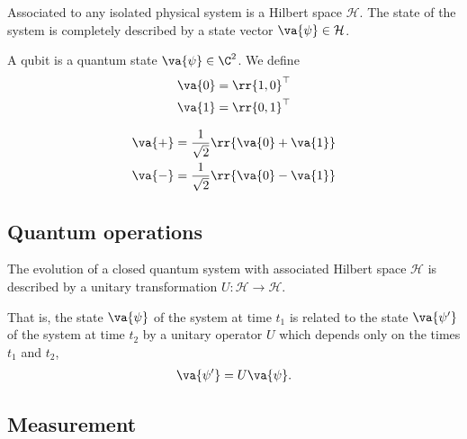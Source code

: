 \documentclass{article}
\begin{document}
\begin{axiom}
  Associated to any isolated physical system is a Hilbert space $\mathcal H$. The state of the system
  is completely described by a state vector $\va{\psi}\in\mathcal H$.
\end{axiom}

\begin{definition}
  \label{def:qubit}
  A qubit is a quantum state $ \va{\psi}\in\C^2$. We define
  \begin{align*}
    \va{ 0 } = \rr{ 1, 0 }^\top \\
    \va{ 1 } = \rr{ 0, 1 }^\top
  \end{align*}
\end{definition}

\begin{definition}
  \label{def:superposition}
  \begin{align*}
    \va{ + } = \frac{1}{\sqrt{2}} \rr{ \va{ 0 } + \va{ 1 } } \\
    \va{ - } = \frac{1}{\sqrt{2}} \rr{ \va{ 0 } - \va{ 1 } }
  \end{align*}
\end{definition}

\subsection{Quantum operations}
\label{sec:quantum-operations}

\begin{axiom}
  \label{def:quantum-operation}
  The evolution of a closed quantum system with associated Hilbert space $\mathcal H$
  is described by a unitary transformation $U:\mathcal H\to\mathcal H$.

  That is, the state $\va{\psi}$ of the system at time $t_1$ is related to the state
  $\va{\psi'}$ of the system at time $t_2$ by a unitary operator $U$ which depends only
  on the times $t_1$ and $t_2$,
  \begin{align*}
    \va{\psi'}=U\va{\psi}.
  \end{align*}
\end{axiom}

\subsection{Measurement}
\label{sec:measurement}
\end{document}
